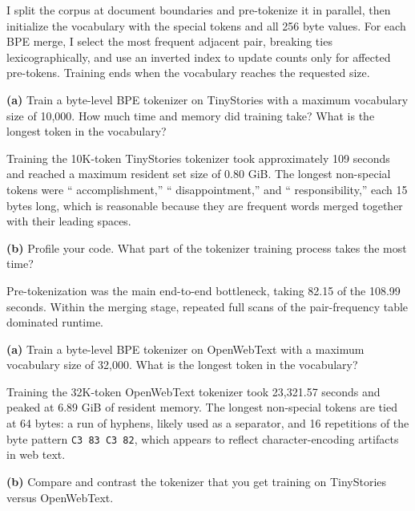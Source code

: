 I split the corpus at document boundaries and pre-tokenize it in parallel, then initialize the vocabulary with the special tokens and all 256 byte values. 
For each BPE merge, I select the most frequent adjacent pair, breaking ties lexicographically, and use an inverted index to update counts only for affected pre-tokens. 
Training ends when the vocabulary reaches the requested size.


\textbf{(a)} Train a byte-level BPE tokenizer on TinyStories with a maximum vocabulary size of 10{,}000. How much time and memory did training take? What is the longest token in the vocabulary?


Training the 10K-token TinyStories tokenizer took approximately 109 seconds and reached a maximum resident set size of 0.80 GiB. 
The longest non-special tokens were `` accomplishment,'' `` disappointment,'' and `` responsibility,'' each 15 bytes long, which is reasonable because they are frequent words merged together with their leading spaces.

\textbf{(b)} Profile your code. What part of the tokenizer training process takes the most time?


Pre-tokenization was the main end-to-end bottleneck, taking 82.15 of the 108.99 seconds. Within the merging stage, repeated full scans of the pair-frequency table dominated runtime.



\textbf{(a)} Train a byte-level BPE tokenizer on OpenWebText with a maximum vocabulary size of 32{,}000. What is the longest token in the vocabulary?


Training the 32K-token OpenWebText tokenizer took 23{,}321.57 seconds and peaked at 6.89 GiB of resident memory. 
The longest non-special tokens are tied at 64 bytes: a run of hyphens, likely used as a separator, and 16 repetitions of the byte pattern \texttt{C3 83 C3 82}, 
which appears to reflect character-encoding artifacts in web text.

\textbf{(b)} Compare and contrast the tokenizer that you get training on TinyStories versus OpenWebText.

